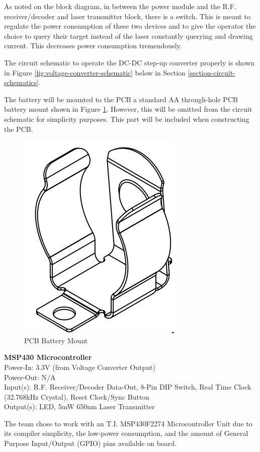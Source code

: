 \documentclass[letterpaper,10pt]{article}
\begin{document}
\begin{spacing}{1.15}
As noted on the block diagram, in between the power module and the R.F. receiver/decoder and laser transmitter block, there is a switch. This is meant to regulate the power consumption of these two devices and to give the operator the choice to query their target instead of the laser constantly querying and drawing current. This decreases power consumption tremendously.

The circuit schematic to operate the DC-DC step-up converter properly is shown in Figure \ref{fig:voltage-converter-schematic} below in Section \ref{section-circuit-schematics}.


The battery will be mounted to the PCB a standard AA through-hole PCB battery mount shown in Figure \ref{fig:pcb-battery-mount}. However, this will be omitted from the circuit schematic for simplicity purposes. This part will be included when constructing the PCB.
\begin{figure} [H]
	\centering
	\includegraphics[scale=0.4]{PCB_Battery_Mount.png}
	\caption{PCB Battery Mount\label{fig:pcb-battery-mount}}
\end{figure}

\normalsize\textbf{MSP430 Microcontroller} \\
Power-In: 3.3V (from Voltage Converter Output) \\
Power-Out: N/A \\
Input(s): R.F. Receiver/Decoder Data-Out, 8-Pin DIP Switch,  Real Time Clock (32.768kHz Crystal), Reset Clock/Sync Button \\
Output(s): LED, 5mW 650nm Laser Transmitter

The team chose to work with an T.I. MSP430F2274 Microcontroller Unit due to its compiler simplicity, the low-power consumption, and the amount of General Purpose Input/Output (GPIO) pins available on board.


\end{spacing}
\end{document}
